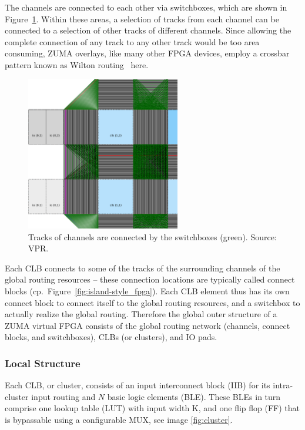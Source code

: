 \documentclass{article}
\begin{document}
\FloatBarrier

The channels are connected to each other via switchboxes,
which are shown in Figure~\ref{fig:switchboxes}.
Within these areas, a selection of tracks from each channel can be connected to a selection of other tracks of different channels.
Since allowing the complete connection of any track to any other track would be too area consuming, ZUMA overlays, like many other FPGA devices, employ a crossbar pattern known as Wilton routing~\cite{wilton1997ArchitecturesandAlgorithms} here.

\begin{figure}[htp]
    \centering
    \includegraphics[width=0.6\textwidth]{Figures/switchbox.pdf}
    \caption{Tracks of channels are connected by the switchboxes (green). Source: VPR.}
    \label{fig:switchboxes}
\end{figure}

Each CLB connects to some of the tracks of the surrounding channels of the global routing resources -- these connection locations are typically called connect blocks (cp.~Figure~\ref{fig:island-style_fpga}).
Each CLB element thus has its own connect block to connect itself to the global routing resources, and a switchbox to actually realize the global routing.
Therefore the global outer structure of a ZUMA virtual FPGA consists of the global routing network (channels, connect blocks, and switchboxes), CLBs (or clusters), and IO pads.

\FloatBarrier
\subsubsection{Local Structure}
Each CLB, or cluster, consists of an input interconnect block (IIB) for its intra-cluster input routing and \(N\) basic logic elements (BLE).
These BLEs in turn comprise one lookup table (LUT) with input width K, and one flip flop (FF) that is bypassable using a configurable MUX, see image \ref{fig:cluster}.
\end{document}
